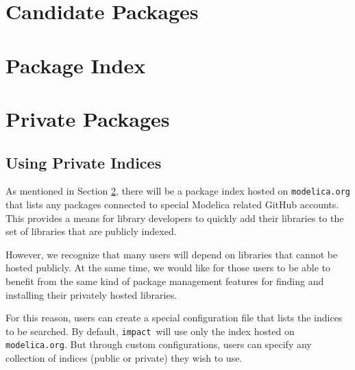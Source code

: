 \documentclass[11pt,a4paper,twocolumn]{article}
\newcommand{\impact}{\texttt{impact}} %
\newcommand{\code}[1]{\texttt{#1}} %
\begin{document}
\section{Candidate Packages}
\label{sec:candidates}





\section{Package Index}
\label{sec:index}




\section{Private Packages}
\label{sec:private}

\subsection{Using Private Indices}
\label{sec:use_private}

As mentioned in Section \ref{sec:index}, there will be a package index hosted
on \code{modelica.org} that lists any packages connected to special Modelica
related GitHub accounts.  This provides a means for library developers to
quickly add their libraries to the set of libraries that are publicly indexed.

However, we recognize that many users will depend on libraries that cannot
be hosted publicly.  At the same time, we would like for those users to be
able to benefit from the same kind of package management features for
finding and installing their privately hosted libraries.

For this reason, users can create a special configuration file that
lists the indices to be searched.  By default, \impact\ will use only
the index hosted on \code{modelica.org}.  But through custom
configurations, users can specify any collection of indices (public
or private) they wish to use.
\end{document}
